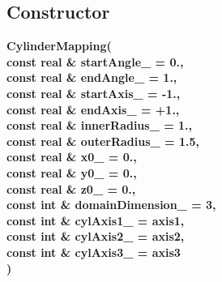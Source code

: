 \subsection{Constructor}
 
\newlength{\CylinderMappingIncludeArgIndent}
\begin{flushleft} \textbf{%
\settowidth{\CylinderMappingIncludeArgIndent}{CylinderMapping(}%
CylinderMapping(\\ 
\hspace{\CylinderMappingIncludeArgIndent}const real \& startAngle\_  = 0.,\\ 
\hspace{\CylinderMappingIncludeArgIndent}const real \& endAngle\_  = 1.,\\ 
\hspace{\CylinderMappingIncludeArgIndent}const real \& startAxis\_  = -1.,\\ 
\hspace{\CylinderMappingIncludeArgIndent}const real \& endAxis\_  = +1.,\\ 
\hspace{\CylinderMappingIncludeArgIndent}const real \& innerRadius\_  = 1., \\ 
\hspace{\CylinderMappingIncludeArgIndent}const real \& outerRadius\_  = 1.5,\\ 
\hspace{\CylinderMappingIncludeArgIndent}const real \& x0\_  = 0., \\ 
\hspace{\CylinderMappingIncludeArgIndent}const real \& y0\_  = 0., \\ 
\hspace{\CylinderMappingIncludeArgIndent}const real \& z0\_  = 0., \\ 
\hspace{\CylinderMappingIncludeArgIndent}const int \& domainDimension\_  = 3,\\ 
\hspace{\CylinderMappingIncludeArgIndent}const int \& cylAxis1\_  = axis1,\\ 
\hspace{\CylinderMappingIncludeArgIndent}const int \& cylAxis2\_  = axis2,\\ 
\hspace{\CylinderMappingIncludeArgIndent}const int \& cylAxis3\_  = axis3\\ 
\hspace{\CylinderMappingIncludeArgIndent})
}\end{flushleft}

